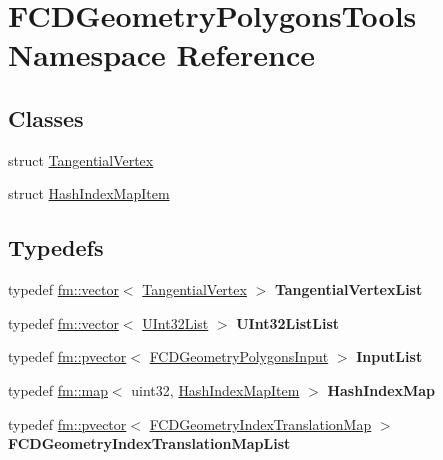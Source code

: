\hypertarget{namespaceFCDGeometryPolygonsTools}{
\section{FCDGeometryPolygonsTools Namespace Reference}
\label{namespaceFCDGeometryPolygonsTools}
}
\subsection*{Classes}
\begin{DoxyCompactItemize}
\item 
struct \hyperlink{structFCDGeometryPolygonsTools_1_1TangentialVertex}{TangentialVertex}
\item 
struct \hyperlink{structFCDGeometryPolygonsTools_1_1HashIndexMapItem}{HashIndexMapItem}
\end{DoxyCompactItemize}
\subsection*{Typedefs}
\begin{DoxyCompactItemize}
\item 
\hypertarget{namespaceFCDGeometryPolygonsTools_a324eb52831fd68edec9f4c53179cef54}{
typedef \hyperlink{classfm_1_1vector}{fm::vector}$<$ \hyperlink{structFCDGeometryPolygonsTools_1_1TangentialVertex}{TangentialVertex} $>$ {\bfseries TangentialVertexList}}
\label{namespaceFCDGeometryPolygonsTools_a324eb52831fd68edec9f4c53179cef54}

\item 
\hypertarget{namespaceFCDGeometryPolygonsTools_af4e70eb8c889999cd7be13dca990efd0}{
typedef \hyperlink{classfm_1_1vector}{fm::vector}$<$ \hyperlink{classfm_1_1vector}{UInt32List} $>$ {\bfseries UInt32ListList}}
\label{namespaceFCDGeometryPolygonsTools_af4e70eb8c889999cd7be13dca990efd0}

\item 
\hypertarget{namespaceFCDGeometryPolygonsTools_ab4f309281805c91af6496bb9bbbc99b2}{
typedef \hyperlink{classfm_1_1pvector}{fm::pvector}$<$ \hyperlink{classFCDGeometryPolygonsInput}{FCDGeometryPolygonsInput} $>$ {\bfseries InputList}}
\label{namespaceFCDGeometryPolygonsTools_ab4f309281805c91af6496bb9bbbc99b2}

\item 
\hypertarget{namespaceFCDGeometryPolygonsTools_a1535da557d2ffde70da72e32142eb4cc}{
typedef \hyperlink{classfm_1_1map}{fm::map}$<$ uint32, \hyperlink{structFCDGeometryPolygonsTools_1_1HashIndexMapItem}{HashIndexMapItem} $>$ {\bfseries HashIndexMap}}
\label{namespaceFCDGeometryPolygonsTools_a1535da557d2ffde70da72e32142eb4cc}

\item 
\hypertarget{namespaceFCDGeometryPolygonsTools_a4a62dc14a8576eecb47c671629babd95}{
typedef \hyperlink{classfm_1_1pvector}{fm::pvector}$<$ \hyperlink{classfm_1_1map}{FCDGeometryIndexTranslationMap} $>$ {\bfseries FCDGeometryIndexTranslationMapList}}
\label{namespaceFCDGeometryPolygonsTools_a4a62dc14a8576eecb47c671629babd95}

\end{DoxyCompactItemize}
